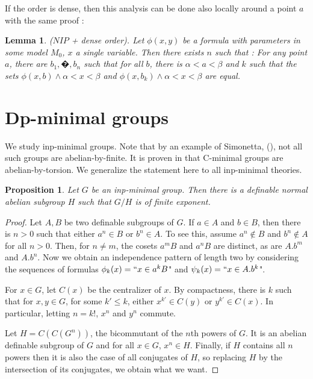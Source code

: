 \documentclass[english]{article}
\newtheorem{prop}[thm]{Proposition}
\newtheorem{lemme}[thm]{Lemma}
\theoremstyle{definition}
\theoremstyle{mystyle}
\theoremstyle{remark}
\begin{document}
If the order is dense, then this analysis can be done also locally around a point $a$ with the same proof :
\begin{lemme}\label{germ2}
($NIP$ + dense order). Let $\phi(x,y)$ be a formula with parameters in some model $M_0$, $x$ a single variable. Then there exists $n$ such that : For any point $a$, there are $b_1,�,b_n$ such that for all $b$, there is $\alpha < a < \beta$ and $k$ such that the sets $\phi(x,b) \wedge \alpha<x<\beta$ and $\phi(x,b_k) \wedge \alpha<x<\beta$ are equal.
\end{lemme}


\section{Dp-minimal groups}

We study inp-minimal groups. Note that by an example of Simonetta, (\cite{Sim}), not all such groups are abelian-by-finite. It is proven in \cite{Cmin} that C-minimal groups are abelian-by-torsion. We generalize the statement here to all inp-minimal theories.

\begin{prop}\label{inpgrp}
Let $G$ be an inp-minimal group. Then there is  a definable normal abelian subgroup $H$ such that $G/H$ is of finite exponent.\end{prop}
\begin{proof}
Let $A, B$ be two definable subgroups of $G$. If $a \in A$ and $b \in B$, then there is $n > 0$ such that either $a^n \in B$ or $b^n \in A$. To see this, assume $a^n \notin B$ and $b^n \notin A$ for
all $n > 0$. Then, for $n \neq m$, the cosets $a^m B$ and $a^n B$ are distinct, as are $A.b^m$ and $A.b^n$. Now we obtain an independence pattern of length two by considering the sequences of formulas $\phi_k(x)=``x \in a^k B$" and $\psi_k(x)=``x \in A.b^k$".

For $x \in G$, let $C(x)$ be the centralizer of $x$. By compactness, there is $k$ such that for $x,y \in G$, for some $k' \leq k$, either $x^{k'} \in C(y)$ or $y^{k'} \in C(x)$. In particular, letting $n = k!$, $x^n$ and $y^n$ commute.

Let $H = C(C(G^n))$, the bicommutant of the $n$th powers of $G$. It is an abelian definable subgroup of $G$ and for all $x \in G$, $x^n \in H$. Finally, if $H$ contains all $n$ powers then it is also the case of all conjugates of $H$, so replacing $H$ by the intersection of its conjugates, we obtain what we want.
 \end{proof}
\end{document}
